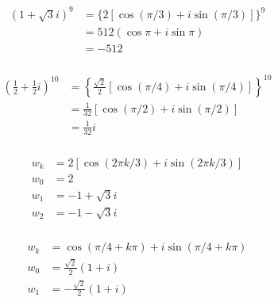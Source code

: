 \documentclass{article}
\begin{document}
\setcounter{subsubsection}{20}
\subsubsection{}

\begin{align*}
  (1 + \sqrt{3} i)^9 & = \{ 2 [\cos (\pi / 3) + i \sin (\pi / 3)] \}^9 \\
                     & = 512 (\cos \pi + i \sin \pi)                   \\
                     & = -512
\end{align*}

\setcounter{subsubsection}{22}
\subsubsection{}

\begin{align*}
  \left( \frac{1}{2} + \frac{1}{2} i \right)^10 & = \left\{ \frac{\sqrt{2}}{2} [\cos (\pi / 4) + i \sin (\pi / 4)] \right\}^{10} \\
                                                & = \frac{1}{32} [\cos (\pi / 2) + i \sin (\pi / 2)]                             \\
                                                & = \frac{1}{32} i
\end{align*}

\setcounter{subsubsection}{26}
\subsubsection{}

\begin{align*}
  w_k & = 2 [\cos (2 \pi k / 3) + i \sin (2 \pi k / 3)] \\
  w_0 & = 2                                             \\
  w_1 & = -1 + \sqrt{3} i                               \\
  w_2 & = -1 - \sqrt{3} i
\end{align*}

\setcounter{subsubsection}{28}
\subsubsection{}

\begin{align*}
  w_k & = \cos (\pi / 4 + k \pi) + i \sin (\pi / 4 + k \pi) \\
  w_0 & = \frac{\sqrt{2}}{2} (1 + i)                        \\
  w_1 & = -\frac{\sqrt{2}}{2} (1 + i)
\end{align*}
\end{document}
